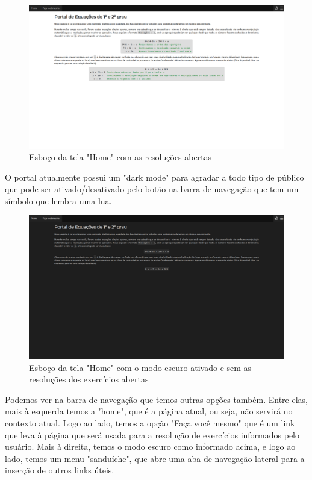 \documentclass[12pt]{report}
\begin{document}
\begin{figure}[H]
    \includegraphics[width=1\textwidth]{img/home.png}
    \caption{Esboço da tela "Home" com as resoluções abertas}
\end{figure}

O portal atualmente possui um "dark mode" para agradar a todo tipo de público que pode ser ativado/desativado pelo botão na barra de navegação que tem um símbolo que lembra uma lua.

\begin{figure}[H]
    \includegraphics[width=1\textwidth]{img/dark-mode.png}
    \caption{Esboço da tela "Home" com o modo escuro ativado e sem as resoluções dos exercícios abertas}
\end{figure}

Podemos ver na barra de navegação que temos outras opções também. Entre elas, mais à esquerda temos a "home", que é a página atual, ou seja, não servirá no contexto atual. Logo ao lado, temos a opção "Faça você mesmo" que é um link que leva à página que será usada para a resolução de exercícios informados pelo usuário. Mais à direita, temos o modo escuro como informado acima, e logo ao lado, temos um menu "sanduíche", que abre uma aba de navegação lateral para a inserção de outros links úteis.
\end{document}
